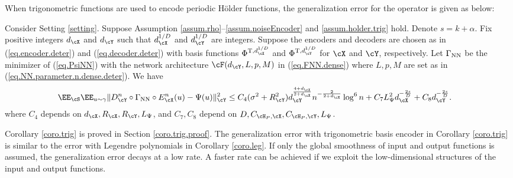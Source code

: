 \documentclass[11pt]{article} %
\begin{document}
When trigonometric functions are used to encode periodic H\"{o}lder functions, the generalization error for the operator is given as below: 
\begin{corollary}\label{coro.trig}
	Consider Setting \ref{setting}.
	Suppose Assumption \ref{assum.rho}--\ref{assum.noiseEncoder} and \ref{assum.holder.trig} hold. Denote $s=k+\alpha$. Fix positive integers 	$d_{\cX}$ and $d_{\cY}$ such that $d_{\cX}^{1/D}$ and $d_{\cY}^{1/D}$ are integers. 
	 Suppose the encoders and decoders are chosen as in (\ref{eq.encoder.deter}) and (\ref{eq.decoder.deter}) with basis functions $\Phi^{{\rm T},d_{\cX}^{1/D}}$ and $\Phi^{{\rm T}, d_{\cY}^{1/D}}$ for $\cX$ and $\cY$, respectively.
	Let $\Gamma_{\rm NN}$ be the minimizer of (\ref{eq.PsiNN}) with the network architecture $\cF(d_{\cY},L,p,M)$ in (\ref{eq.FNN.dense}) where $L,p,M$ are set as in (\ref{eq.NN.parameter.n.dense.deter}). We have
	\begin{align*}
		&\EE_{\cS}\EE_{u\sim \gamma}\|D_{\cY}^n\circ \Gamma_{\rm NN} \circ E_{\cX}^n(u)- \Psi(u)\|_{\cY}^2 
		\leq C_{4}(\sigma^2+R_{\cY}^2)d_{\cY}^{\frac{4+d_{\cX}}{2+d_{\cX}}}n^{-\frac{2}{2+d_{\cX}}}\log^6 n + C_7L_{\Psi}^2d_{\cX}^{-\frac{2s}{D}}+C_8d_{\cY}^{-\frac{2s}{D}}.
	\end{align*}
	where $C_{4}$ depends on $d_{\cX},R_{\cX},R_{\cY},L_{\Psi}$, and $C_7,C_8$ depend on $D,C_{\cH_P,\cX},C_{\cH_P,\cY},L_{\Psi}$.
\end{corollary}

Corollary \ref{coro.trig} is proved in Section \ref{coro.trig.proof}. The generalization error with trigonometric basis encoder in Corollary \ref{coro.trig}  is similar to the error with Legendre polynomials in Corollary \ref{coro.leg}. If only the global smoothness of input and output functions is assumed, the generalization error decays at a low rate. A faster rate can be achieved if we exploit the low-dimensional structures of the input and output functions.  
\end{document}
